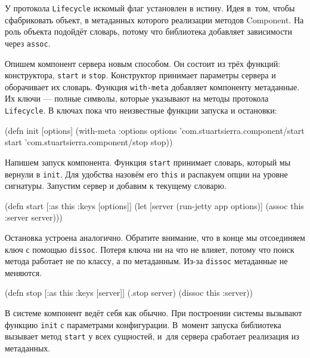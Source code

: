 У протокола \verb|Lifecycle| искомый флаг установлен в истину. Идея в~том, чтобы
сфабриковать объект, в метаданных которого реализации методов Component. На роль
объекта подойдёт словарь, потому что библиотека добавляет зависимости через
\verb|assoc|.

Опишем компонент сервера новым способом. Он состоит из трёх функций:
конструктора, \verb|start| и \verb|stop|. Конструктор принимает параметры
сервера и оборачивает их словарь. Функция \verb|with-meta| добавляет компоненту
метаданные. Их ключи — полные символы, которые указывают на методы протокола
\verb|Lifecycle|. В ключах пока что неизвестные функции запуска и остановки:

\begin{english}
  \begin{clojure}
(defn init [options]
  (with-meta {:options options}
    {'com.stuartsierra.component/start start
     'com.stuartsierra.component/stop stop}))
  \end{clojure}
\end{english}

Напишем запуск компонента. Функция \verb|start| принимает словарь, который мы
вернули в \verb|init|. Для удобства назовём его \verb|this| и распакуем опции на
уровне сигнатуры. Запустим сервер и добавим к текущему словарю.

\begin{english}
  \begin{clojure}
(defn start
  [{:as this :keys [options]}]
  (let [server (run-jetty app options)]
    (assoc this :server server)))
  \end{clojure}
\end{english}

Остановка устроена аналогично. Обратите внимание, что в конце мы отсоединяем
ключ с помощью \verb|dissoc|. Потеря ключа ни на что не влияет, потому что поиск
метода работает не по классу, а по метаданным. Из-за \verb|dissoc| метаданные не
меняются.

\begin{english}
  \begin{clojure}
(defn stop
  [{:as this :keys [server]}]
  (.stop server)
  (dissoc this :server))
  \end{clojure}
\end{english}

В системе компонент ведёт себя как обычно. При построении системы вызывают
функцию \verb|init| с параметрами конфигурации. В~момент запуска библиотека
вызывает метод \verb|start| у всех сущностей, и~для сервера сработает
реализация из метаданных.

